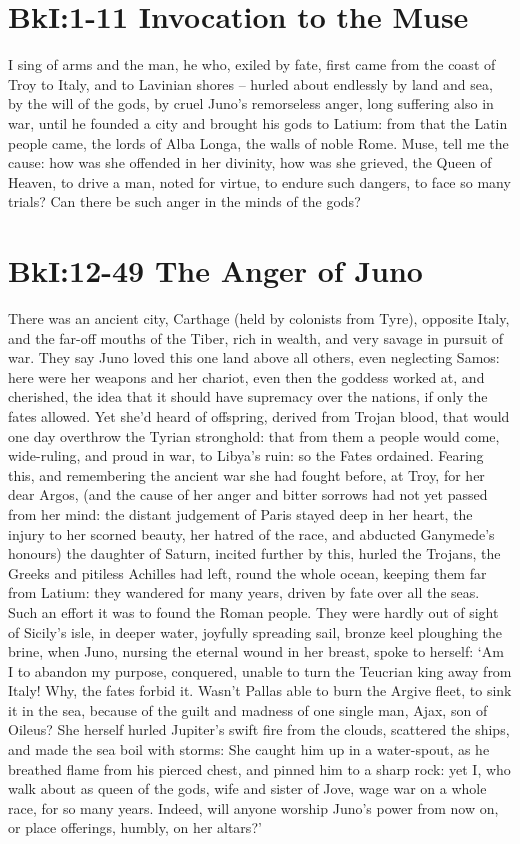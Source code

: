 \documentclass[12pt, usletter]{article}
\begin{document}
\section*{BkI:1-11 Invocation to the Muse}
I sing of arms and the man, he who, exiled by fate,
first came from the coast of Troy to Italy, and to
Lavinian shores – hurled about endlessly by land and sea,
by the will of the gods, by cruel Juno’s remorseless anger,
long suffering also in war, until he founded a city
and brought his gods to Latium: from that the Latin people
came, the lords of Alba Longa, the walls of noble Rome.
Muse, tell me the cause: how was she offended in her divinity,
how was she grieved, the Queen of Heaven, to drive a man,
noted for virtue, to endure such dangers, to face so many
trials? Can there be such anger in the minds of the gods?

\section*{BkI:12-49 The Anger of Juno}
There was an ancient city, Carthage (held by colonists from Tyre),
opposite Italy, and the far-off mouths of the Tiber,
rich in wealth, and very savage in pursuit of war.
They say Juno loved this one land above all others,
even neglecting Samos: here were her weapons
and her chariot, even then the goddess worked at,
and cherished, the idea that it should have supremacy
over the nations, if only the fates allowed.
Yet she’d heard of offspring, derived from Trojan blood,
that would one day overthrow the Tyrian stronghold:
that from them a people would come, wide-ruling,
and proud in war, to Libya’s ruin: so the Fates ordained.
Fearing this, and remembering the ancient war
she had fought before, at Troy, for her dear Argos,
(and the cause of her anger and bitter sorrows
had not yet passed from her mind: the distant judgement
of Paris stayed deep in her heart, the injury to her scorned beauty,
her hatred of the race, and abducted Ganymede’s honours)
the daughter of Saturn, incited further by this,
hurled the Trojans, the Greeks and pitiless Achilles had left,
round the whole ocean, keeping them far from Latium:
they wandered for many years, driven by fate over all the seas.
Such an effort it was to found the Roman people.
They were hardly out of sight of Sicily’s isle, in deeper water,
joyfully spreading sail, bronze keel ploughing the brine,
when Juno, nursing the eternal wound in her breast,
spoke to herself: ‘Am I to abandon my purpose, conquered,
unable to turn the Teucrian king away from Italy!
Why, the fates forbid it. Wasn’t Pallas able to burn
the Argive fleet, to sink it in the sea, because of the guilt
and madness of one single man, Ajax, son of Oileus?
She herself hurled Jupiter’s swift fire from the clouds,
scattered the ships, and made the sea boil with storms:
She caught him up in a water-spout, as he breathed flame
from his pierced chest, and pinned him to a sharp rock:
yet I, who walk about as queen of the gods, wife
and sister of Jove, wage war on a whole race, for so many years.
Indeed, will anyone worship Juno’s power from now on,
or place offerings, humbly, on her altars?’
\end{document}
